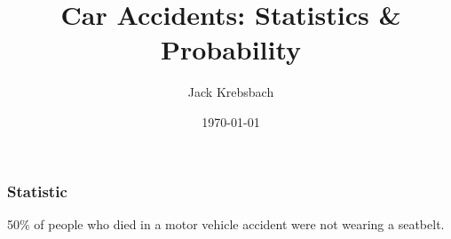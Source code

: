 \documentclass{beamer}
\title{Car Accidents: Statistics \& Probability}
\author{Jack Krebsbach}
\institute{Hope College}
\date{\today}
\begin{document}
\frame{\titlepage}

\begin{frame}
\frametitle{Statistic}
 50\% of people who died in a motor vehicle accident were not wearing a seatbelt.
\end{frame}
\end{document}
